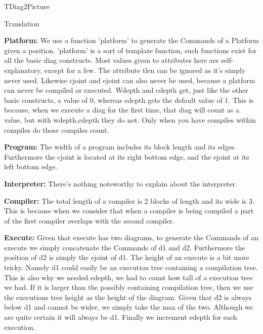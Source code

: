 \documentclass{article}
\begin{document}
\begin{subsection}{TDiag2Picture}
\begin{subsubsection}{Translation}
\hfill \break

\textbf{Platform:} We use a function 'platform' to generate the Commands of a Platform given a position. 'platform' is a sort of template function, such functions exist for all the basic diag constructs. Most values given to attributes here are self-explanatory, except for a few. The attribute tlen can be ignored as it's simply never used. Likewise cjoint and ejoint can also never be used, because a platform can never be compiled or executed. Wdepth and cdepth get, just like the other basic constructs, a value of 0, whereas edepth gets the default value of 1. This is because, when we execute a diag for the first time, that diag will count as a value, but with wdepth,cdepth they do not. Only when you have compiles within compiles do those compiles count.

\hfill \break

\textbf{Program:} The width of a program includes its block length and its edges. Furthermore the cjoint is located at its right bottom edge, and the ejoint at its left bottom edge.

\hfill \break

\textbf{Interpreter:} There's nothing noteworthy to explain about the interpreter.

\hfill \break

\textbf{Compiler:} The total length of a compiler is 2 blocks of length and its wide is 3. This is because when we consider that when a compiler is being compiled a part of the first compiler overlaps with the second compiler.

\hfill \break

\textbf{Execute:} Given that execute has two diagrams, to generate the Commands of an execute we simply concatenate the Commands of d1 and d2. Furthermore the position of d2 is simply the ejoint of d1. The height of an execute is a bit more tricky. Namely d1 could easily be an execution tree containing a compilation tree. This is also why we needed edepth, we had to count how tall of a execution tree we had. If it is larger than the possibly containing compilation tree, then we use the executions tree height as the height of the diagram. Given that d2 is always below d1 and cannot be wider, we simply take the max of the two. Although we are quite certain it will always be d1. Finally we increment edepth for each execution.

\hfill \break


\end{subsubsection}
\end{subsection}
\end{document}
